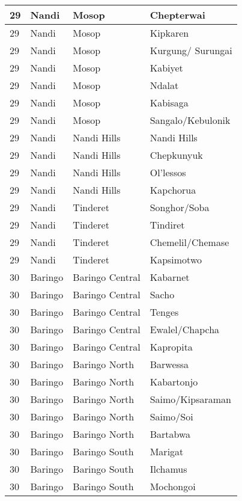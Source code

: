 \begin{table}[!ht]
\begin{tabular}{|l|l|l|l|}
        29 & Nandi & Mosop & Chepterwai \\ \hline
        29 & Nandi & Mosop & Kipkaren \\ \hline
        29 & Nandi & Mosop & Kurgung/ Surungai \\ \hline
        29 & Nandi & Mosop & Kabiyet \\ \hline
        29 & Nandi & Mosop & Ndalat \\ \hline
        29 & Nandi & Mosop & Kabisaga \\ \hline
        29 & Nandi & Mosop & Sangalo/Kebulonik \\ \hline
        29 & Nandi & Nandi Hills & Nandi Hills \\ \hline
        29 & Nandi & Nandi Hills & Chepkunyuk \\ \hline
        29 & Nandi & Nandi Hills & Ol’lessos \\ \hline
        29 & Nandi & Nandi Hills & Kapchorua \\ \hline
        29 & Nandi & Tinderet & Songhor/Soba \\ \hline
        29 & Nandi & Tinderet & Tindiret \\ \hline
        29 & Nandi & Tinderet & Chemelil/Chemase \\ \hline
        29 & Nandi & Tinderet & Kapsimotwo \\ \hline
        30 & Baringo & Baringo Central & Kabarnet \\ \hline
        30 & Baringo & Baringo Central & Sacho \\ \hline
        30 & Baringo & Baringo Central & Tenges \\ \hline
        30 & Baringo & Baringo Central & Ewalel/Chapcha \\ \hline
        30 & Baringo & Baringo Central & Kapropita \\ \hline
        30 & Baringo & Baringo North & Barwessa \\ \hline
        30 & Baringo & Baringo North & Kabartonjo \\ \hline
        30 & Baringo & Baringo North & Saimo/Kipsaraman \\ \hline
        30 & Baringo & Baringo North & Saimo/Soi \\ \hline
        30 & Baringo & Baringo North & Bartabwa \\ \hline
        30 & Baringo & Baringo South & Marigat \\ \hline
        30 & Baringo & Baringo South & Ilchamus \\ \hline
        30 & Baringo & Baringo South & Mochongoi \\ \hline

\end{tabular}
\end{table}

